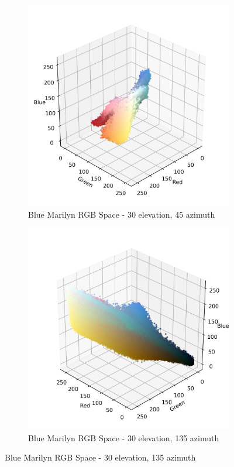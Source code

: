 \documentclass{article}
\begin{document}
\begin{figure}[ht]
  \centering
  \begin{subfigure}{0.45\textwidth}
    \includegraphics[width=\textwidth]{main_files/figure-latex/4_13_blue_marilyn_original_scatter.jpg}
    \caption{Blue Marilyn RGB Space - 30 \degree elevation, 45 \degree azimuth}
    \label{fig:4_13_blue_marilyn_original_scatter}
  \end{subfigure}
  \hfill
  \begin{subfigure}{0.45\textwidth}
    \includegraphics[width=\textwidth]{main_files/figure-latex/4_14_blue_marilyn_original_scatter.jpg}
    \caption{Blue Marilyn RGB Space - 30 \degree elevation, 135 \degree azimuth}
    \label{fig:4_14_blue_marilyn_original_scatter}
  \end{subfigure}
  \label{fig:blue_marilyn_original_scatter_1}
\end{figure}
\end{document}
